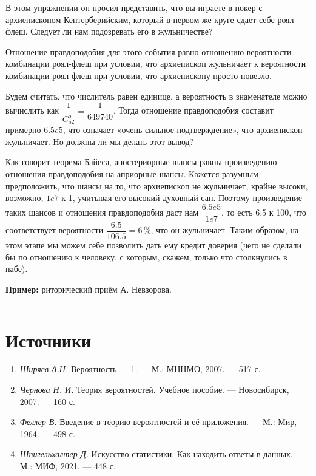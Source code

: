 \documentclass[11pt,a4paper]{article}
\providecommand{\tightlist}{%
      \setlength{\itemsep}{0pt}\setlength{\parskip}{0pt}}
\begin{document}
В этом упражнении он просил представить, что вы играете в покер с
архиепископом Кентерберийским, который в первом же круге сдает себе
роял-флеш. Следует ли нам подозревать его в жульничестве?

Отношение правдоподобия для этого события равно отношению вероятности
комбинации роял-флеш при условии, что архиепископ жульничает к
вероятности комбинации роял-флеш при условии, что архиепископу просто
повезло.

Будем считать, что числитель равен единице, а вероятность в знаменателе
можно вычислить как \(\dfrac{1}{C^5_{52}} = \dfrac{1}{649740}\). Тогда
отношение правдоподобия составит примерно \(6.5e5\), что означает «очень
сильное подтверждение», что архиепископ жульничает. Но должны ли мы
делать этот вывод?

Как говорит теорема Байеса, апостериорные шансы равны произведению
отношения правдоподобия на априорные шансы. Кажется разумным
предположить, что шансы на то, что архиепископ не жульничает, крайне
высоки, возможно, \(1e7\) к 1, учитывая его высокий духовный сан.
Поэтому произведение таких шансов и отношения правдоподобия даст нам
\(\dfrac{6.5e5}{1e7}\), то есть 6.5 к 100, что соответствует вероятности
\(\dfrac{6.5}{106.5} = 6\,\%\), что он жульничает. Таким образом, на
этом этапе мы можем себе позволить дать ему кредит доверия (чего не
сделали бы по отношению к человеку, с которым, скажем, только что
столкнулись в пабе).

    \textbf{Пример:} риторический приём А. Невзорова.

    \begin{center}\rule{0.5\linewidth}{0.5pt}\end{center}

    \hypertarget{ux438ux441ux442ux43eux447ux43dux438ux43aux438}{%
\section{Источники}\label{ux438ux441ux442ux43eux447ux43dux438ux43aux438}}

\begin{enumerate}
\def\labelenumi{\arabic{enumi}.}
\tightlist
\item
  \emph{Ширяев А.Н.} Вероятность --- 1. --- М.: МЦНМО, 2007. --- 517 с.
\item
  \emph{Чернова Н. И.} Теория вероятностей. Учебное пособие. ---
  Новосибирск, 2007. --- 160 с.
\item
  \emph{Феллер В.} Введение в теорию вероятностей и её приложения. ---
  М.: Мир, 1964. --- 498 с.
\item
  \emph{Шпигельхалтер Д.} Искусство статистики. Как находить ответы в
  данных. --- М.: МИФ, 2021. --- 448 с.
\end{enumerate}
\end{document}
